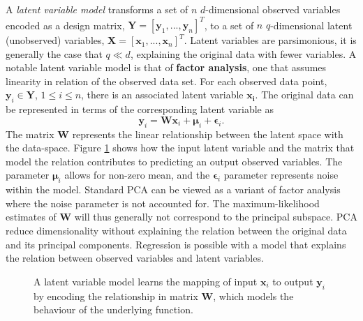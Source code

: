 \documentclass[ %
author={Dillon Keith Diep},
supervisor={Dr. Carl Henrik Ek},
degree={MEng},
title={ART-CG Hair:},
subtitle={Assisted Real-time Content Generation of Stylised Virtual Hair},
type={Research},
year={2017} ]{dissertation}
\begin{document}
	A \textit{latent variable model} transforms a set of $n$ $d$-dimensional observed variables encoded as a design matrix, $\bm{Y}=[\bm{y}_1,...,\bm{y}_n]^T$, to a set of $n$ $q$-dimensional latent (unobserved) variables, $\bm{X}=[\bm{x}_1,...,\bm{x}_n]^T$. Latent variables are parsimonious, it is generally the case that $q \ll d$, explaining the original data with fewer variables. A notable latent variable model is that of \textbf{factor analysis}, one that assumes linearity in relation of the observed data set.
	For each observed data point, $\bm{y}_i \in \bm{Y}$, $1 \leq i \leq n $, there is an associated latent variable $\bm{x_i}$. The original data can be represented in terms of the corresponding latent variable as
	\begin{equation} \label{ppca:fa}
	\bm{y}_i=\bm{Wx}_i+\bm{\mu}_i+\bm{\epsilon}_i.
	\end{equation}
	The matrix $\bm{W}$ represents the linear relationship between the latent space with the data-space. Figure \ref{lvm} shows how the input latent variable and the matrix that model the relation contributes to predicting an output observed variables.
	The parameter $\bm{\mu}_i$ allows for non-zero mean, and the $\bm{\epsilon}_i$ parameter represents noise within the model. Standard PCA can be viewed as a variant of factor analysis where the noise parameter is not accounted for. The maximum-likelihood estimates of $\bm{W}$ will thus generally not correspond to the principal subspace. PCA reduce dimensionality without explaining the relation between the original data and its principal components. Regression is possible with a model that explains the relation between observed variables and latent variables.
	
	\begin{figure}[!h]
		\centering
		\caption{A latent variable model learns the mapping of input $\bm{x}_i$ to output $\bm{y}_i$ by encoding the relationship in matrix $\bm{W}$, which models the behaviour of the underlying function.}
		\vspace{0.1cm}
		\label{lvm}
	\end{figure} 
	
\end{document}
